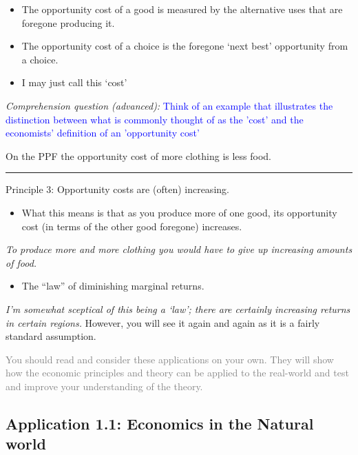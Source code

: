 \documentclass[]{article}
\providecommand{\tightlist}{%
  \setlength{\itemsep}{0pt}\setlength{\parskip}{0pt}}
\begin{document}
\begin{itemize}
\tightlist
\item
  The opportunity cost of a good is measured by the alternative uses
  that are foregone producing it.
\item
  The opportunity cost of a choice is the foregone `next best'
  opportunity from a choice.
\item
  I may just call this `cost'
\end{itemize}

\emph{Comprehension question (advanced):}
\textcolor{blue}{Think of an example that illustrates the distinction between what is commonly thought of as the  'cost' and the economists' definition of an 'opportunity cost'}

On the PPF the opportunity cost of more clothing is less food.\\

\begin{center}\rule{0.5\linewidth}{\linethickness}\end{center}

Principle 3: Opportunity costs are (often) increasing.

\begin{itemize}
\tightlist
\item
  What this means is that as you produce more of one good, its
  opportunity cost (in terms of the other good foregone) increases.
\end{itemize}

\emph{To produce more and more clothing you would have to give up
increasing amounts of food.}

\begin{itemize}
\tightlist
\item
  The ``law'' of diminishing marginal returns.
\end{itemize}

\emph{I'm somewhat sceptical of this being a `law'; there are certainly
increasing returns in certain regions.} However, you will see it again
and again as it is a fairly standard assumption.

\textcolor{gray}{You should read and consider these applications on your own. They will show how the economic principles and theory can be applied to the real-world and test and improve your understanding of the theory.}

\hypertarget{application-1.1-economics-in-the-natural-world}{%
\subsection{Application 1.1: Economics in the Natural
world}\label{application-1.1-economics-in-the-natural-world}}
\end{document}
